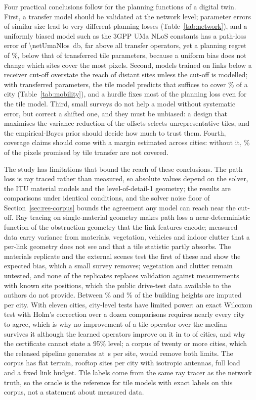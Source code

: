 Four practical conclusions follow for the planning functions of a digital
twin. First, a transfer model should be validated at the network level;
parameter errors of similar size lead to very different planning losses
(Table~\ref{tab:network}), and a uniformly biased model such as the 3GPP
UMa NLoS constants has a path-loss error of \SI{\netUmaNlos}{\decibel}, far
above all transfer operators, yet a planning regret of \regretUmaNlos\%,
below that of transferred tile parameters, because a uniform bias does not
change which sites cover the most pixels. Second, models trained on links
below a receiver cut-off overstate the reach of distant sites unless the
cut-off is modelled; with transferred parameters, the tile model predicts
that \sitesNeedGbdt{} suffices to cover \covTarget\% of a city
(Table~\ref{tab:mobility}), and a hurdle fixes most of the planning
loss even for the tile model. Third, small surveys do not help a model
without systematic error, but correct a shifted one, and they must be
unbiased: a design that maximises the variance reduction of the offsets
selects unrepresentative tiles, and the empirical-Bayes prior should decide
how much to trust them. Fourth, coverage claims should come with a margin
estimated across cities: without it, \certNaiveFalseGbdt\% of the pixels
promised by tile transfer are not covered.

The study has limitations that bound the reach of these conclusions. The
path loss is ray traced rather than measured, so absolute values depend on
the solver, the ITU material models and the level-of-detail-1 geometry;
the results are comparisons under identical conditions, and the solver
noise floor of Section~\ref{sec:res-corpus} bounds the agreement any model
can reach near the cut-off. Ray tracing on single-material geometry makes
path loss a near-deterministic function of the obstruction geometry that
the link features encode; measured data carry variance from materials,
vegetation, vehicles and indoor clutter that a per-link geometry does not
see and that a tile statistic partly absorbs. The materials replicate and
the external scenes test the first of these and show the expected bias,
which a small survey removes; vegetation and clutter remain untested, and
none of the replicates replaces validation against measurements with known
site positions, which the public drive-test data available to the authors
do not provide. Between \impMin\% and \impMax\% of the building heights are
imputed per city. With eleven cities, city-level tests have limited power:
an exact Wilcoxon test with Holm's correction over a dozen comparisons
requires nearly every city to agree, which is why no improvement of a tile
operator over the median survives it although the learned operators improve
on it in \learnedBetterMin{} to \learnedBetterMax{} of \nFolds{} cities,
and why the certificate cannot state a 95\% level; a corpus of twenty or
more cities, which the released pipeline generates at \rtSecPerSite{}\,s
per site, would remove both limits. The corpus has flat terrain,
\nSitesPerCity{} rooftop sites per city with isotropic antennas, full load
and a fixed link budget. Tile labels come from the same ray tracer as the
network truth, so the oracle is the reference for tile models with exact
labels on this corpus, not a statement about measured data.
